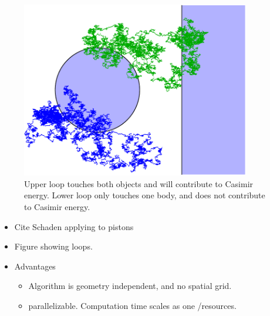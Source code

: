 \begin{itemize}
\begin{figure}
\center
\includegraphics[width=10cm]{fig/intro/hit_strong_coupling}
\caption{Upper loop touches both objects and will contribute to Casimir energy.  Lower loop only touches one body, and does not contribute to Casimir energy.}
\end{figure}


\begin{itemize}
\item Cite Schaden applying to pistons\cite{Schaden2009}
\item Figure showing loops.  
\item Advantages
  \begin{itemize}
  \item Algorithm is geometry independent, and no spatial grid.
  \item parallelizable.  Computation time scales as one /resources.  
  \end{itemize}


\end{itemize}
\end{itemize}
